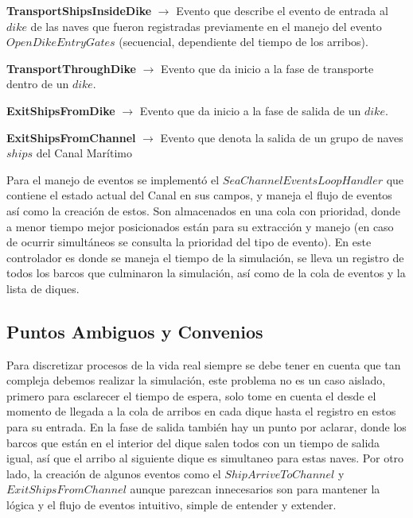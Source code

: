 \documentclass[a4paper,10pt,twocolumn]{article}
\begin{document}
 \textbf{TransportShipsInsideDike} $\rightarrow$ Evento que describe el evento de entrada al $dike$ de las naves que fueron registradas previamente en el manejo del evento $OpenDikeEntryGates$ (secuencial, dependiente del tiempo de los arribos).
 
 \textbf{TransportThroughDike} $\rightarrow$ Evento que da inicio a la fase de transporte dentro de un $dike$.
 
 \textbf{ExitShipsFromDike} $\rightarrow$ Evento que da inicio a la fase de salida de un $dike$.

 \textbf{ExitShipsFromChannel} $\rightarrow$ Evento que denota la salida de un grupo de naves $ships$ del Canal Mar\'itimo
 
 Para el manejo de eventos se implement\'o el $SeaChannelEventsLoopHandler$ que contiene el estado actual del Canal en sus campos, y maneja el flujo de eventos as\'i como la creaci\'on de estos. Son almacenados en una cola con prioridad, donde a menor tiempo mejor posicionados est\'an para su extracci\'on y manejo (en caso de ocurrir simult\'aneos se consulta la prioridad del tipo de evento). En este controlador es donde se maneja el tiempo de la simulaci\'on, se lleva un registro de todos los barcos que culminaron la simulaci\'on, as\'i como de la cola de eventos y la lista de diques.
 
 
  
\subsection{Puntos Ambiguos y Convenios }

  Para discretizar procesos de la vida real siempre se debe tener en cuenta que tan compleja debemos realizar la simulaci\'on, este problema no es un caso aislado, primero para esclarecer el tiempo de espera, solo tome en cuenta el desde el momento de llegada a la cola de arribos en cada dique hasta el registro en estos para su entrada. En la fase de salida tambi\'en hay un punto por aclarar, donde los barcos que est\'an en el interior del dique salen todos con un tiempo de salida igual, as\'i que el arribo al siguiente dique es simultaneo para estas naves. Por otro lado, la creaci\'on de algunos eventos como el $ShipArriveToChannel$ y $ExitShipsFromChannel$ aunque parezcan innecesarios son para mantener la l\'ogica y el flujo de eventos intuitivo, simple de entender y extender.

\end{document}

